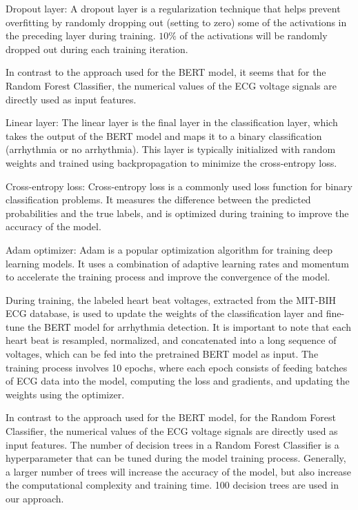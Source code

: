 Dropout layer: A dropout layer is a regularization technique that helps prevent overfitting by randomly dropping out (setting to zero) some of the activations in the preceding layer during training. $10\%$ of the activations will be randomly dropped out during each training iteration.


In contrast to the approach used for the BERT model, it seems that for the Random Forest Classifier, the numerical values of the ECG voltage signals are directly used as input features.


Linear layer: The linear layer is the final layer in the classification layer, which takes the output of the BERT model and maps it to a binary classification (arrhythmia or no arrhythmia). This layer is typically initialized with random weights and trained using backpropagation to minimize the cross-entropy loss.

Cross-entropy loss: Cross-entropy loss is a commonly used loss function for binary classification problems. It measures the difference between the predicted probabilities and the true labels, and is optimized during training to improve the accuracy of the model.

Adam optimizer: Adam is a popular optimization algorithm for training deep learning models. It uses a combination of adaptive learning rates and momentum to accelerate the training process and improve the convergence of the model.

During training, the labeled heart beat voltages, extracted from the MIT-BIH ECG database, is used to update the weights of the classification layer and fine-tune the BERT model for arrhythmia detection. It is important to note that each heart beat is resampled, normalized, and concatenated into a long sequence of voltages, which can be fed into the pretrained BERT model as input. The training process involves 10 epochs, where each epoch consists of feeding batches of ECG data into the model, computing the loss and gradients, and updating the weights using the optimizer. 

In contrast to the approach used for the BERT model, for the Random Forest Classifier, the numerical values of the ECG voltage signals are directly used as input features. The number of decision trees in a Random Forest Classifier is a hyperparameter that can be tuned during the model training process. Generally, a larger number of trees will increase the accuracy of the model, but also increase the computational complexity and training time. 100 decision trees are used in our approach.